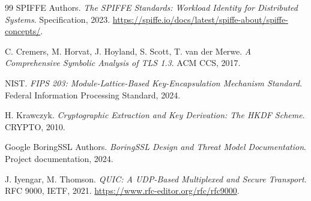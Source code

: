 \documentclass[11pt,a4paper]{article}
\theoremstyle{plain}
\theoremstyle{definition}
\begin{document}
\begin{thebibliography}{99}
 SPIFFE Authors.
  \emph{The SPIFFE Standards: Workload Identity for Distributed Systems}.
  Specification, 2023.
  \url{https://spiffe.io/docs/latest/spiffe-about/spiffe-concepts/}.

 C. Cremers, M. Horvat, J. Hoyland, S. Scott,
  T. van der Merwe.
  \emph{A Comprehensive Symbolic Analysis of TLS 1.3}.
  ACM CCS, 2017.

 NIST.
  \emph{FIPS 203: Module-Lattice-Based Key-Encapsulation Mechanism Standard}.
  Federal Information Processing Standard, 2024.

 H. Krawczyk.
  \emph{Cryptographic Extraction and Key Derivation: The HKDF Scheme}.
  CRYPTO, 2010.

 Google BoringSSL Authors.
  \emph{BoringSSL Design and Threat Model Documentation}.
  Project documentation, 2024.

 J. Iyengar, M. Thomson.
  \emph{QUIC: A UDP-Based Multiplexed and Secure Transport}. RFC 9000,
  IETF, 2021.
  \url{https://www.rfc-editor.org/rfc/rfc9000}.

\end{thebibliography}
\end{document}
